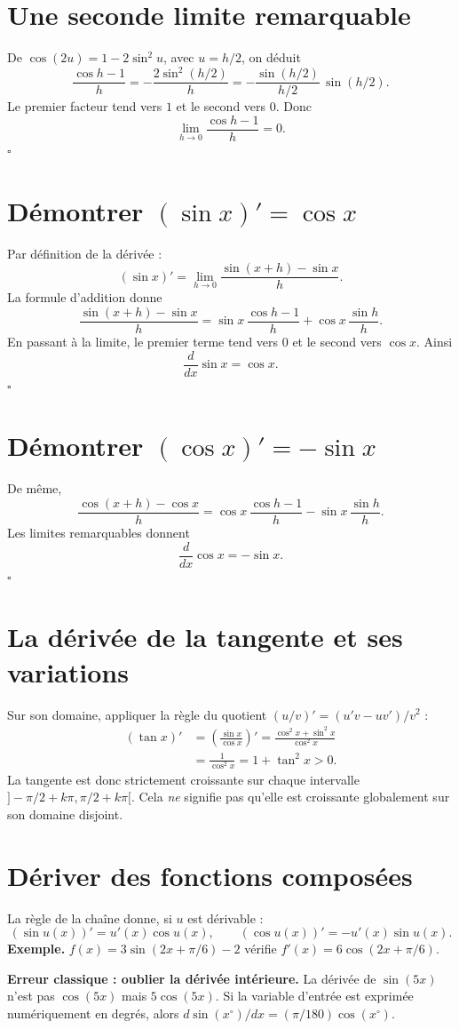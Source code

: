 \documentclass[../cours_spe_trigo.tex]{subfiles}
\begin{document}
\section{Une seconde limite remarquable}
\begin{demonstration}
De $\cos(2u)=1-2\sin^2u$, avec $u=h/2$, on déduit
\[
\frac{\cos h-1}{h}=-\frac{2\sin^2(h/2)}{h}
=-\frac{\sin(h/2)}{h/2}\,\sin(h/2).
\]
Le premier facteur tend vers $1$ et le second vers $0$. Donc
\[\boxed{\displaystyle\lim_{h\to0}\frac{\cos h-1}{h}=0.}\]
$\square$
\end{demonstration}

\section{Démontrer $(\sin x)'=\cos x$}
\begin{demonstration}
Par définition de la dérivée :
\[
(\sin x)'=\lim_{h\to0}\frac{\sin(x+h)-\sin x}{h}.
\]
La formule d'addition donne
\[
\frac{\sin(x+h)-\sin x}{h}
=\sin x\,\frac{\cos h-1}{h}+\cos x\,\frac{\sin h}{h}.
\]
En passant à la limite, le premier terme tend vers $0$ et le second vers $\cos x$. Ainsi
\[\boxed{\frac{d}{dx}\sin x=\cos x.}\]
$\square$
\end{demonstration}
\section{Démontrer $(\cos x)'=-\sin x$}
\begin{demonstration}
De même,
\[
\frac{\cos(x+h)-\cos x}{h}
=\cos x\,\frac{\cos h-1}{h}-\sin x\,\frac{\sin h}{h}.
\]
Les limites remarquables donnent
\[\boxed{\frac{d}{dx}\cos x=-\sin x.}\]
$\square$
\end{demonstration}
\section{La dérivée de la tangente et ses variations}
Sur son domaine, appliquer la règle du quotient $\left(u/v\right)'=(u'v-uv')/v^2$ :
\[
\begin{aligned}
(\tan x)'&=\left(\frac{\sin x}{\cos x}\right)'=
\frac{\cos^2x+\sin^2x}{\cos^2x}\\
&=\boxed{\frac1{\cos^2x}=1+\tan^2x>0}.
\end{aligned}
\]
La tangente est donc strictement croissante sur chaque intervalle $]-\pi/2+k\pi,\pi/2+k\pi[$. Cela \emph{ne} signifie pas qu'elle est croissante globalement sur son domaine disjoint.

\section{Dériver des fonctions composées}
La règle de la chaîne donne, si $u$ est dérivable :
\[
\boxed{(\sin u(x))'=u'(x)\cos u(x),\qquad
(\cos u(x))'=-u'(x)\sin u(x).}
\]
\textbf{Exemple.} $f(x)=3\sin(2x+\pi/6)-2$ vérifie $f'(x)=6\cos(2x+\pi/6)$.
\begin{attention}
\textbf{Erreur classique : oublier la dérivée intérieure.} La dérivée de $\sin(5x)$ n'est pas $\cos(5x)$ mais $5\cos(5x)$. Si la variable d'entrée est exprimée numériquement en degrés, alors $d\sin(x^\circ)/dx=(\pi/180)\cos(x^\circ)$.
\end{attention}
\end{document}
